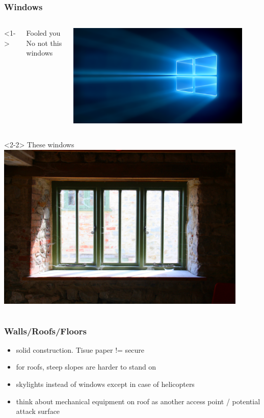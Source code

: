 \documentclass[]{beamer}
\begin{document}
\begin{frame}
  \frametitle{Windows}
  \begin{columns}[c]<1->
    \begin{block}{Fooled you}
      No not this windows
    \end{block}
    \includegraphics[width=0.9\textwidth]{Windows_10_Hero}
  \end{columns}
  \vspace{1mm}
  \begin{columns}[c]<2-2>
    These windows
    \includegraphics[width=0.9\textwidth]{Window}
  \end{columns}
\end{frame}

\begin{frame}
  \frametitle{Walls/Roofs/Floors}
  \begin{itemize}
    \item solid construction. Tisue paper != secure
    \item for roofs, steep slopes are harder to stand on
    \item skylights instead of windows except in case of helicopters
    \item think about mechanical equipment on roof as another access point / potential attack surface
  \end{itemize}
\end{frame}
\end{document}
